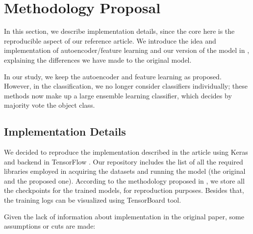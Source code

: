 \section{Methodology Proposal}
\label{sec:propose}

In this section, we describe implementation details, since the core here is the reproducible aspect of our reference article. We introduce the idea and implementation of autoencoder/feature learning and our version of the model in \cite{WenZha:2018}, explaining the differences we have made to the original model.

In our study, we keep the autoencoder and feature learning as proposed. However, in the classification, we no longer consider classifiers individually; these methods now make up a large ensemble learning classifier, which decides by majority vote the object class.

\subsection{Implementation Details}

We decided to reproduce the implementation described in the article using Keras \cite{chollet2018keras} and backend in TensorFlow \cite{tensorflow}. Our repository includes the list of all the required libraries employed in acquiring the datasets and running the model (the original and the proposed one). According to the methodology proposed in \cite{Fuente:2019}, we store all the checkpoints for the trained models, for reproduction purposes. Besides that, the training logs can be visualized using TensorBoard tool.

Given the lack of information about implementation in the original paper, some assumptions or cuts are made: 

